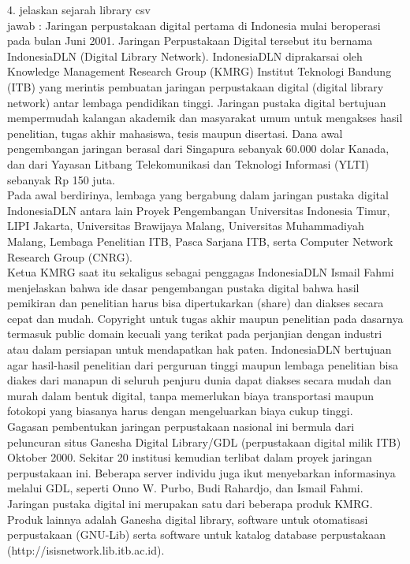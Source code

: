 \begin{enumerate}
4. jelaskan sejarah library csv\\
jawab : Jaringan perpustakaan digital pertama di Indonesia mulai beroperasi pada bulan Juni 2001.  Jaringan Perpustakaan Digital tersebut itu bernama IndonesiaDLN (Digital Library Network).  IndonesiaDLN diprakarsai oleh Knowledge Management Research Group (KMRG) Institut Teknologi Bandung (ITB) yang merintis pembuatan jaringan perpustakaan digital (digital library network) antar lembaga pendidikan tinggi.  Jaringan pustaka digital bertujuan mempermudah kalangan akademik dan masyarakat umum untuk mengakses hasil penelitian, tugas akhir mahasiswa, tesis maupun disertasi. Dana awal pengembangan jaringan berasal dari Singapura sebanyak 60.000 dolar Kanada, dan dari Yayasan Litbang Telekomunikasi dan Teknologi Informasi (YLTI) sebanyak Rp 150 juta. \\

Pada awal berdirinya, lembaga yang bergabung dalam jaringan pustaka digital IndonesiaDLN antara lain Proyek Pengembangan Universitas Indonesia Timur, LIPI Jakarta, Universitas Brawijaya Malang, Universitas Muhammadiyah Malang, Lembaga Penelitian ITB, Pasca Sarjana ITB, serta Computer Network Research Group (CNRG).\\

Ketua KMRG saat itu sekaligus sebagai penggagas IndonesiaDLN Ismail Fahmi menjelaskan bahwa ide dasar pengembangan pustaka digital bahwa hasil pemikiran dan penelitian harus bisa dipertukarkan (share) dan diakses secara cepat dan mudah. Copyright untuk tugas akhir maupun penelitian pada dasarnya termasuk public domain kecuali yang terikat pada perjanjian dengan industri atau dalam persiapan untuk mendapatkan hak paten. IndonesiaDLN bertujuan agar hasil-hasil penelitian dari perguruan tinggi maupun lembaga penelitian bisa diakes dari manapun di seluruh penjuru dunia dapat diakses secara mudah dan murah dalam bentuk digital, tanpa memerlukan biaya transportasi maupun fotokopi yang biasanya harus dengan mengeluarkan biaya cukup tinggi.\\

Gagasan pembentukan jaringan perpustakaan nasional ini bermula dari peluncuran situs Ganesha Digital Library/GDL (perpustakaan digital milik ITB) Oktober 2000. Sekitar 20 institusi kemudian terlibat dalam proyek jaringan perpustakaan ini. Beberapa server individu juga ikut menyebarkan informasinya melalui GDL, seperti Onno W. Purbo, Budi Rahardjo, dan Ismail Fahmi.\\

Jaringan pustaka digital ini merupakan satu dari beberapa produk KMRG. Produk lainnya adalah Ganesha digital library, software untuk otomatisasi perpustakaan (GNU-Lib) serta software untuk katalog database perpustakaan\\
(http://isisnetwork.lib.itb.ac.id).\\


\end{enumerate}

